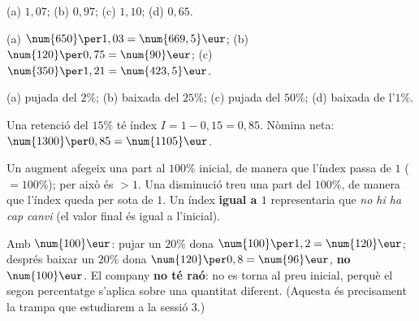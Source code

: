 \begin{solucions}
\begin{sollist}
  \item (a) $1,07$; \quad (b) $0,97$; \quad (c) $1,10$; \quad (d) $0,65$.
  \item (a) $\num{650}\per 1,03=\num{669,5}\eur$; \quad
        (b) $\num{120}\per 0,75=\num{90}\eur$; \quad
        (c) $\num{350}\per 1,21=\num{423,5}\eur$.
  \item (a) pujada del $2\%$; \quad (b) baixada del $25\%$; \quad (c) pujada del $50\%$;
        \quad (d) baixada de l'$1\%$.
  \item Una retenció del $15\%$ té índex $I=1-0,15=0,85$. Nòmina neta:
        $\num{1300}\per 0,85=\num{1105}\eur$.
  \item Un augment afegeix una part al $100\%$ inicial, de manera que l'índex passa de
        $1$ ($=100\%$); per això és $>1$. Una disminució treu una part del $100\%$, de
        manera que l'índex queda per sota de $1$. Un índex \textbf{igual a $1$}
        representaria que \emph{no hi ha cap canvi} (el valor final és igual a
        l'inicial).
  \item Amb $\num{100}\eur$: pujar un $20\%$ dona $\num{100}\per 1,2=\num{120}\eur$;
        després baixar un $20\%$ dona $\num{120}\per 0,8=\num{96}\eur$, \textbf{no}
        $\num{100}\eur$. El company \textbf{no té raó}: no es torna al preu inicial,
        perquè el segon percentatge s'aplica sobre una quantitat diferent. (Aquesta és
        precisament la trampa que estudiarem a la sessió 3.)
\end{sollist}
\end{solucions}
